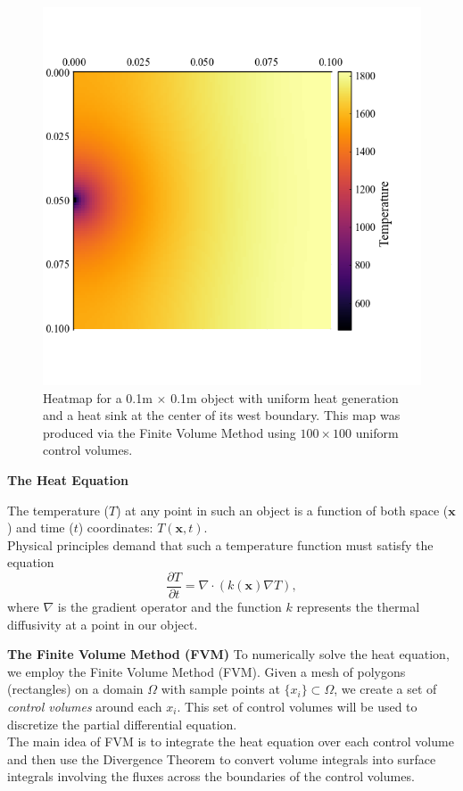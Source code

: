 \documentclass[final]{beamer}
\begin{document}
\begin{frame}
	\begin{figure}
		\centering
		\includegraphics[height=0.65\textwidth]{Heatmap_Example.png}
		\caption[Heatmap Example]{Heatmap for a 0.1m $\times$ 0.1m object with uniform heat generation and a heat sink at the center of its west boundary. This map was produced via the Finite Volume Method using $100\times 100$ uniform control volumes.}
		\label{fig:heatmap-example}
	\end{figure}
\end{frame}

\begin{frame}{\textbf{The Heat Equation}}

The temperature ($T$) at any point in such an object is a function of both space ($\mathbf{x}$) and time ($t$) coordinates: $T(\mathbf{x},t)$.\\\vspace{1em}\pause
Physical principles demand that such a temperature function must satisfy the equation
\begin{equation}
	\frac{\partial T}{\partial t}=\nabla\cdot\left(k(\mathbf{x})\nabla T\right)\label{eqn:HeatEq},
\end{equation}
where $\nabla$ is the {\color{baystate}gradient operator} and the function $k$ represents the {\color{baystate}thermal diffusivity} at a point in our object.
\end{frame}

\begin{frame}[t]{\bf The Finite Volume Method (FVM)}
	To numerically solve the heat equation, we employ the Finite Volume Method (FVM).\pause
	\vfill
	Given a mesh of polygons (rectangles) on a domain $\Omega$ with sample points at $\lbrace x_i\rbrace\subset\Omega$, we create a set of {\color{baystate}\textit{control volumes}} around each $x_i$. {\color{tiananmen}This set of control volumes will be used to discretize the partial differential equation.}\\\vfill\pause
	{\color{tiananmen}The main idea of FVM is to integrate} the heat equation over each control volume and then use the {\color{baystate}Divergence Theorem} to convert volume integrals into surface integrals involving the fluxes across the boundaries of the control volumes.
	\vfill
\end{frame}
\end{document}
